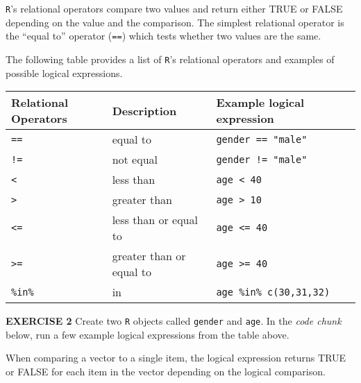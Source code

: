\documentclass[
]{article}
\newenvironment{Shaded}{\begin{snugshade}}{\end{snugshade}}
\newcommand{\CommentTok}[1]{\textcolor[rgb]{0.56,0.35,0.01}{\textit{#1}}}
\newcommand{\DecValTok}[1]{\textcolor[rgb]{0.00,0.00,0.81}{#1}}
\newcommand{\KeywordTok}[1]{\textcolor[rgb]{0.13,0.29,0.53}{\textbf{#1}}}
\newcommand{\NormalTok}[1]{#1}
\newcommand{\OperatorTok}[1]{\textcolor[rgb]{0.81,0.36,0.00}{\textbf{#1}}}
\newcommand{\StringTok}[1]{\textcolor[rgb]{0.31,0.60,0.02}{#1}}
\begin{document}
\texttt{R}'s relational operators compare two values and return either
TRUE or FALSE depending on the value and the comparison. The simplest
relational operator is the ``equal to'' operator (\texttt{==}) which
tests whether two values are the same.

The following table provides a list of \texttt{R}'s relational operators
and examples of possible logical expressions.

\begin{longtable}[]{@{}lll@{}}
\toprule
Relational Operators & Description & Example logical
expression\tabularnewline
\midrule
\endhead
\texttt{==} & equal to & \texttt{gender\ ==\ "male"}\tabularnewline
\texttt{!=} & not equal & \texttt{gender\ !=\ "male"}\tabularnewline
\texttt{\textless{}} & less than &
\texttt{age\ \textless{}\ 40}\tabularnewline
\texttt{\textgreater{}} & greater than &
\texttt{age\ \textgreater{}\ 10}\tabularnewline
\texttt{\textless{}=} & less than or equal to &
\texttt{age\ \textless{}=\ 40}\tabularnewline
\texttt{\textgreater{}=} & greater than or equal to &
\texttt{age\ \textgreater{}=\ 40}\tabularnewline
\texttt{\%in\%} & in & \texttt{age\ \%in\%\ c(30,31,32)}\tabularnewline
\bottomrule
\end{longtable}

\textbf{EXERCISE 2} Create two \texttt{R} objects called \texttt{gender}
and \texttt{age}. In the \emph{code chunk} below, run a few example
logical expressions from the table above.

\begin{Shaded}
\end{Shaded}

When comparing a vector to a single item, the logical expression returns
TRUE or FALSE for each item in the vector depending on the logical
comparison.
\end{document}

